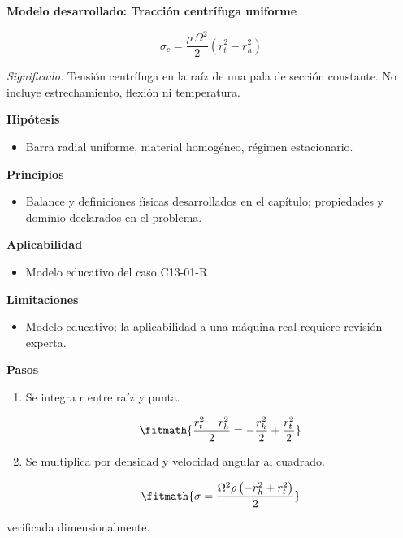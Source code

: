 \documentclass[10pt,openany]{book}
\begin{document}
\begin{tcolorbox}[title={Desarrollos del modelo}, studiumdef, breakable]

\noindent\textbf{Modelo desarrollado: Tracción centrífuga uniforme}

\begin{equation}
\sigma_c=\frac{\rho\,\Omega^2}{2}\left(r_t^2-r_h^2\right)
\label{eq:EC-C13}
\end{equation}

\noindent\textit{Significado.} Tensión centrífuga en la raíz de una pala de sección constante. No incluye estrechamiento, flexión ni temperatura.

\noindent\textbf{Hipótesis}
\begin{itemize}
\item Barra radial uniforme, material homogéneo, régimen estacionario.
\end{itemize}

\noindent\textbf{Principios}
\begin{itemize}
\item Balance y definiciones físicas desarrollados en el capítulo; propiedades y dominio declarados en el problema.
\end{itemize}

\noindent\textbf{Aplicabilidad}
\begin{itemize}
\item Modelo educativo del caso C13-01-R
\end{itemize}

\noindent\textbf{Limitaciones}
\begin{itemize}
\item Modelo educativo; la aplicabilidad a una máquina real requiere revisión experta.
\end{itemize}

\noindent\textbf{Pasos}
\begin{enumerate}
\item
Se integra r entre raíz y punta.

\[
\fitmath{\frac{r_t^2 - r_h^2}{2}=- \frac{r_h^{2}}{2} + \frac{r_t^{2}}{2}}
\]
\item
Se multiplica por densidad y velocidad angular al cuadrado.

\[
\fitmath{\sigma=\frac{\Omega^{2} \rho \left(- r_h^{2} + r_t^{2}\right)}{2}}
\]
\end{enumerate}

{\noindent\footnotesize verificada dimensionalmente.\par}
\end{tcolorbox}
\end{document}

